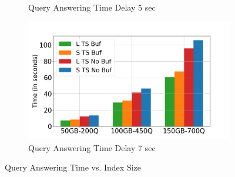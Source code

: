 \begin{figure}
\begin{subfigure}[c]{0.45\textwidth}
		\caption{Query Answering Time Delay 5 sec}
		\label{fig:QA-xAxis-delay-5}
	\end{subfigure}
	\begin{subfigure}[c]{0.45\textwidth}
		\includegraphics[width=1\textwidth]   {figures/Experiments/Dynamic/xAxis/x_axis_delay[7].png}
		\caption{Query Answering Time Delay 7 sec}
		\label{fig:QA-xAxis-delay-7}
	\end{subfigure}
	\caption{Query Answering Time vs. Index Size}
\end{figure}



